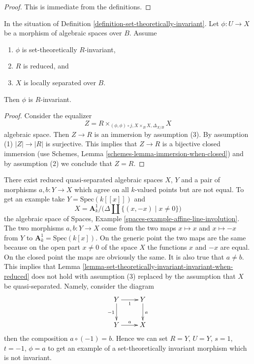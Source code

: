\begin{proof}
This is immediate from the definitions.
\end{proof}

\begin{lemma}
\label{lemma-set-theoretically-invariant-invariant-when-reduced}
In the situation of Definition \ref{definition-set-theoretically-invariant}.
Let $\phi : U \to X$ be a morphism of algebraic spaces over $B$.
Assume
\begin{enumerate}
\item $\phi$ is set-theoretically $R$-invariant,
\item $R$ is reduced, and
\item $X$ is locally separated over $B$.
\end{enumerate}
Then $\phi$ is $R$-invariant.
\end{lemma}

\begin{proof}
Consider the equalizer
$$
Z = R \times_{(\phi, \phi) \circ j, X \times_B X, \Delta_{X/B}} X
$$
algebraic space. Then $Z \to R$ is an immersion by assumption (3).
By assumption (1) $|Z| \to |R|$ is surjective. This implies that
$Z \to R$ is a bijective closed immersion (use
Schemes, Lemma \ref{schemes-lemma-immersion-when-closed})
and by assumption (2) we conclude that $Z = R$.
\end{proof}

\begin{example}
\label{example-not-invariant}
There exist reduced quasi-separated algebraic spaces $X$, $Y$ and a pair of
morphisms $a, b : Y \to X$ which agree on all $k$-valued points but are not
equal. To get an example take $Y = \text{Spec}(k[[x]])$ and
$$
X = \mathbf{A}^1_k \Big/ \big(\Delta \amalg \{(x, -x) \mid x \not = 0\}\big)
$$
the algebraic space of
Spaces, Example \ref{spaces-example-affine-line-involution}.
The two morphisms $a, b : Y \to X$
come from the two maps $x \mapsto x$ and $x \mapsto -x$
from $Y$ to $\mathbf{A}^1_k = \text{Spec}(k[x])$. On the generic point
the two maps are the same because on the open part $x \not = 0$ of the
space $X$ the functions $x$ and $-x$ are equal. On the closed point
the maps are obviously the same. It is also true that $a \not = b$.
This implies that
Lemma \ref{lemma-set-theoretically-invariant-invariant-when-reduced}
does not hold with assumption (3) replaced by the assumption that $X$
be quasi-separated. Namely, consider the diagram
$$
\xymatrix{
Y \ar[d]_{-1} \ar[r]_1 & Y \ar[d]^a \\
Y \ar[r]^a & X
}
$$
then the composition $a \circ (-1) = b$. Hence we can set $R = Y$,
$U = Y$, $s = 1$, $t = -1$, $\phi = a$ to get an example of a set-theoretically
invariant morphism which is not invariant.
\end{example}

